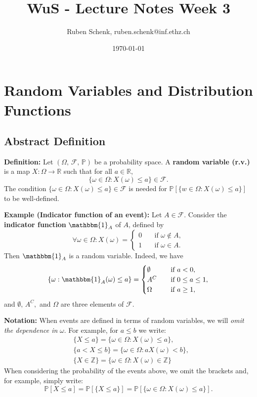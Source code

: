 \documentclass[a4paper]{extarticle}
\title{WuS - Lecture Notes Week 3}
\author{Ruben Schenk, ruben.schenk@inf.ethz.ch}
\date{\today}
\begin{document}
\maketitle

\section{Random Variables and Distribution Functions}

\subsection{Abstract Definition}

\textbf{Definition:} Let \((\Omega, \, \mathcal{F}, \, \mathbb{P})\) be a probability space. A \textbf{random variable (r.v.)} is a map \(X : \Omega \to \mathbb{R}\) such that for all \(a \in \mathbb{R}\),
\[
    \{\omega \in \Omega : X(\omega) \leq a\} \in \mathcal{F}.
\]
The condition \(\{\omega \in \Omega : X(\omega) \leq a\} \in \mathcal{F}\) is needed for \(\mathbb{P}[\{w \in \Omega : X(\omega) \leq a\}]\) to be well-defined.

\begin{ebox}
    \textbf{Example (Indicator function of an event):} Let \(A \in \mathcal{F}\). Consider the \textbf{indicator function} \(\mathbbm{1}_A\) of \(A\), defined by
    \[
        \forall \omega \in \Omega : X(\omega) = \begin{cases}
            0 \quad &\text{if } \omega \notin A, \\
            1 \quad &\text{if } \omega \in A.
        \end{cases}
    \]
    Then \(\mathbbm{1}_A\) is a random variable. Indeed, we have
    \[
        \{\omega : \mathbbm{1}_A(\omega) \leq a\} = \begin{cases}
            \emptyset \quad &\text{if } a < 0, \\
            A^C \quad &\text{if } 0 \leq a \leq 1, \\
            \Omega \quad &\text{if } a \geq 1,
        \end{cases}
    \]
    and \(\emptyset, \, A^C,\) and \(\Omega\) are three elements of \(\mathcal{F}\).
\end{ebox}

\textbf{Notation:} When events are defined in terms of random variables, we will \textit{omit the dependence in} \(\omega\). For example, for \(a \leq b\) we write:
\begin{align*}
    &\{X \leq a\} = \{\omega \in \Omega : X(\omega) \leq a\},\\
    &\{a < X \leq b\} = \{\omega \in \Omega : a X(\omega) < b\},\\
    &\{X \in \mathbb{Z}\} = \{\omega \in \Omega : X(\omega) \in \mathbb{Z}\}
\end{align*}
When considering the probability of the events above, we omit the brackets and, for example, simply write:
\[
    \mathbb{P}[X \leq a] = \mathbb{P}[\{X \leq a\}] = \mathbb{P}[\{\omega \in \Omega : X(\omega) \leq a\}].
\]
\end{document}
